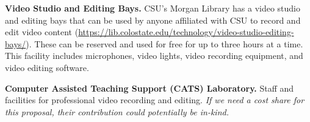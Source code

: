 \documentclass[pdftex,english,11pt,parskip=half]{scrartcl}
\begin{document}
\textbf{Video Studio and Editing Bays.} CSU's Morgan Library has a video studio and editing bays that can be used by anyone affiliated with CSU to record and edit video content (\url{https://lib.colostate.edu/technology/video-studio-editing-bays/}). These can be reserved and used for free for up to three hours at a time. This facility includes microphones, video lights, video recording equipment, and video editing software.

\textbf{Computer Assisted Teaching Support (CATS) Laboratory.} Staff and facilities for professional video recording and editing. \textit{If we need a cost share for this proposal, their contribution could potentially be in-kind.}
\end{document}
